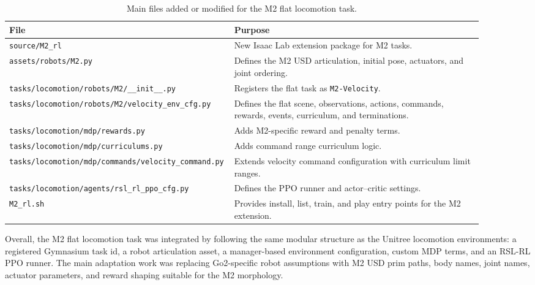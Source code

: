 \begin{table}[h]
    \centering
    \caption{Main files added or modified for the M2 flat locomotion task.}
    \begin{tabular}{p{0.38\linewidth} p{0.52\linewidth}}
        \hline
        \textbf{File} & \textbf{Purpose} \\
        \hline
        \texttt{source/M2\_rl} & New Isaac Lab extension package for M2 tasks. \\
        \texttt{assets/robots/M2.py} & Defines the M2 USD articulation, initial pose, actuators, and joint ordering. \\
        \texttt{tasks/locomotion/robots/M2/\_\_init\_\_.py} & Registers the flat task as \texttt{M2-Velocity}. \\
        \texttt{tasks/locomotion/robots/M2/velocity\_env\_cfg.py} & Defines the flat scene, observations, actions, commands, rewards, events, curriculum, and terminations. \\
        \texttt{tasks/locomotion/mdp/rewards.py} & Adds M2-specific reward and penalty terms. \\
        \texttt{tasks/locomotion/mdp/curriculums.py} & Adds command range curriculum logic. \\
        \texttt{tasks/locomotion/mdp/commands/velocity\_command.py} & Extends velocity command configuration with curriculum limit ranges. \\
        \texttt{tasks/locomotion/agents/rsl\_rl\_ppo\_cfg.py} & Defines the PPO runner and actor--critic settings. \\
        \texttt{M2\_rl.sh} & Provides install, list, train, and play entry points for the M2 extension. \\
        \hline
    \end{tabular}
    \label{tab:M2_flat_task_files}
\end{table}

Overall, the M2 flat locomotion task was integrated by following the same modular structure as the
Unitree locomotion environments: a registered Gymnasium task id, a robot articulation asset, a
manager-based environment configuration, custom MDP terms, and an RSL-RL PPO runner. The main adaptation
work was replacing Go2-specific robot assumptions with M2 USD prim paths, body names, joint names,
actuator parameters, and reward shaping suitable for the M2 morphology.
